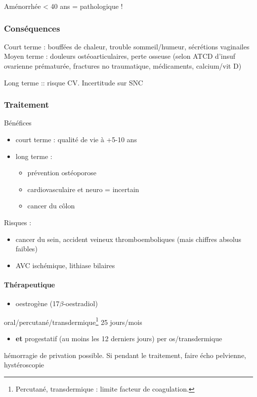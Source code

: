 \documentclass[11pt]{article}
\begin{document}
Aménorrhée < 40 ans = pathologique !

\subsubsection{Conséquences}
\label{sec:orgc81b423}
Court terme : bouffées de chaleur, trouble sommeil/humeur, \dec sécrétions
vaginailes
Moyen terme : douleurs ostéoarticulaires, \inc perte osseuse (selon ATCD d'insuf
ovarienne prématurée, fractures no traumatique, médicaments, calcium/vit D)

Long terme :: \inc risque CV. Incertitude sur SNC

\subsubsection{Traitement}
\label{sec:orgb1523cf}
Bénéfices
\begin{itemize}
\item court terme : qualité de vie à +5-10 ans
\item long terme :
\begin{itemize}
\item prévention ostéoporose
\item cardiovasculaire et neuro = incertain
\item cancer du côlon
\end{itemize}
\end{itemize}
Risques :
\begin{itemize}
\item \inc cancer du sein, accident veineux thromboemboliques (mais chiffres absolus
faibles)
\item \inc AVC ischémique, lithiase bilaires
\end{itemize}

\paragraph{Thérapeutique}
\label{sec:orga85d611}
\begin{itemize}
\item oestrogène (17\(\beta\)-oestradiol)
\end{itemize}
oral/percutané/transdermique\footnote{Percutané, transdermique : limite \inc facteur de coagulation.} 25 jours/mois
\begin{itemize}
\item \textbf{et} progestatif (au moins les 12 derniers jours) per os/transdermique
\end{itemize}
\danger hémorragie de privation possible. Si pendant le traitement, faire écho
pelvienne, hystéroscopie
\end{document}
